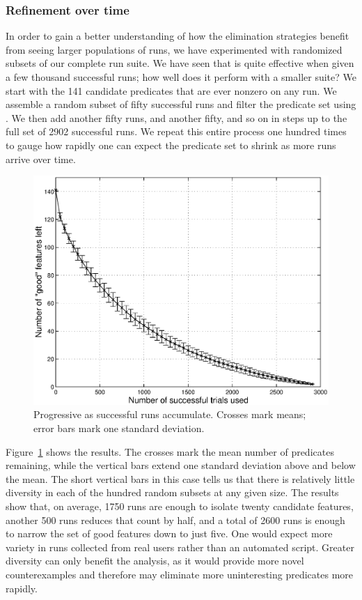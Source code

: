 \subsubsection{Refinement over time}

In order to gain a better understanding of how the elimination
strategies benefit from seeing larger populations of runs, we have
experimented with randomized subsets of our complete run suite.  We
have seen that  is
quite effective when given a few thousand successful runs; how well
does it perform with a smaller suite?  We start with the 141 candidate
predicates that are ever nonzero on any run.  We assemble a random
subset of fifty successful runs and filter the predicate set using
.  We then add another
fifty runs, and another fifty, and so on in steps up to the full set
of 2902 successful runs.  We repeat this entire process one hundred
times to gauge how rapidly one can expect the predicate set to shrink
as more runs arrive over time.

\begin{figure}
  \centering
  \small
  \includegraphics[width=\columnwidth]{applications/ds1000ngood_plot}
  \caption{Progressive 
    as successful runs accumulate.  Crosses mark means; error bars
    mark one standard deviation.}
  \label{fig:ngood}
\end{figure}

Figure~\ref{fig:ngood} shows the results.  The crosses mark the mean
number of predicates remaining, while the vertical bars extend one
standard deviation above and below the mean.  The short vertical bars
in this case tells us that there is relatively little diversity in
each of the hundred random subsets at any given size.  The results
show that, on average, 1750 runs are enough to isolate twenty
candidate features, another 500 runs reduces that count by half, and a
total of 2600 runs is enough to narrow the set of good features down
to just five.  One would expect more variety in runs collected from
real users rather than an automated script.  Greater diversity can
only benefit the analysis, as it would provide more novel
counterexamples and therefore may eliminate more uninteresting
predicates more rapidly.


